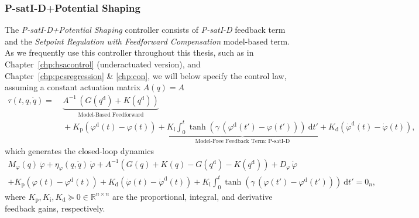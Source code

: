 \subsubsection{P-satI-D+Potential Shaping}
The \emph{P-satI-D+Potential Shaping} controller consists of \emph{P-satI-D} feedback term and the \emph{Setpoint Regulation with Feedforward Compensation} model-based term.
As we frequently use this controller throughout this thesis, such as in Chapter~\ref{chp:hsacontrol} (underactuated version), and Chapter~\ref{chp:pcsregression} \& \ref{chp:con}, we will below specify the control law, assuming a constant actuation matrix $A(q) = A$
\begin{equation}
\begin{split}
    \tau(t,q,\dot{q}) =& \: \underbrace{A^{-1} \, \left ( G(q^\mathrm{d}) + K(q^\mathrm{d}) \right )}_\text{Model-Based Feedforward}\\
    & \: + \underbrace{K_\mathrm{p} \left (\varphi^\mathrm{d}(t) - \varphi(t) \right ) + K_\mathrm{i} \int_0^t \tanh \left ( \gamma \, ( \varphi^\mathrm{d}(t')-\varphi(t') ) \right ) \: \mathrm{d} t' + K_\mathrm{d} \left ( \dot{\varphi}^\mathrm{d}(t) - \dot{\varphi}(t) \right )}_\text{Model-Free Feedback Term: P-satI-D},
\end{split}
\end{equation}
which generates the closed-loop dynamics
\begin{equation}
\begin{split}
    M_\varphi(q) \, \ddot{\varphi} + \eta_\varphi(q,\dot{q}) \, \dot{\varphi} + A^{-1} \left ( G(q) + K(q) - G(q^\mathrm{d}) - K(q^\mathrm{d}) \right ) + D_\varphi \, \dot{\varphi}\\
    + K_\mathrm{p} \left (\varphi(t) - \varphi^\mathrm{d}(t) \right ) + K_\mathrm{d} \left ( \dot{\varphi}(t) - \dot{\varphi}^\mathrm{d}(t) \right ) + K_\mathrm{i} \int_0^t \tanh \left ( \gamma \, ( \varphi(t')-\varphi^\mathrm{d}(t') ) \right ) \: \mathrm{d} t' = 0_n,
\end{split}
\end{equation}
where $K_\mathrm{p}, K_\mathrm{i}, K_\mathrm{d} \succeq 0 \in \mathbb{R}^{n \times n}$ are the proportional, integral, and derivative feedback gains, respectively.


